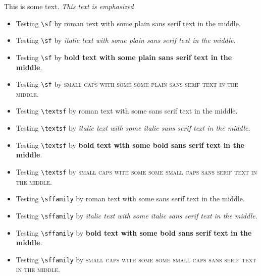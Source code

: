 \documentclass{article}
\begin{document}
This is some text.  \emph{This text is emphasized}
\begin{itemize}
\item
Testing \verb#\sf# by \textrm{roman text with {\sf some plain sans serif text} in the middle}.
\item
Testing \verb#\sf# by \textit{italic text with {\sf some plain sans serif text} in the middle}.
\item
Testing \verb#\sf# by \textbf{bold text with {\sf some plain sans serif text} in the middle}.
\item
Testing \verb#\sf# by \textsc{small caps with some {\sf some plain sans serif text} in the middle}.
\item
Testing \verb#\textsf# by \textrm{roman text with \textsf{some sans serif text} in the middle}.
\item
Testing \verb#\textsf# by \textit{italic text with \textsf{some italic sans serif text} in the middle}.
\item
Testing \verb#\textsf# by \textbf{bold text with \textsf{some bold sans serif text} in the middle}.
\item
Testing \verb#\textsf# by \textsc{small caps with some \textsf{some small caps sans serif text} in the middle}.
\item
Testing \verb#\sffamily# by \textrm{roman text with {\sffamily some sans serif text} in the middle}.
\item
Testing \verb#\sffamily# by \textit{italic text with {\sffamily some italic sans serif text} in the middle}.
\item
Testing \verb#\sffamily# by \textbf{bold text with {\sffamily some bold sans serif text} in the middle}.
\item
Testing \verb#\sffamily# by \textsc{small caps with some {\sffamily some small caps sans serif text} in the middle}.
\end{itemize}
\end{document}
